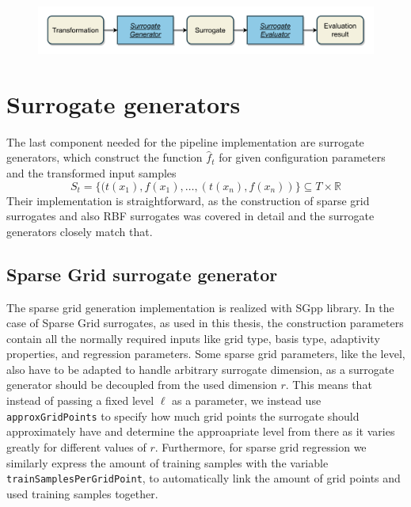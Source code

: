\documentclass[
  a4paper,  %
  twoside,  %
  bibliography=totoc,
  headsepline,
  cleardoublepage=empty,
  parskip=half,
  draft=false
]{scrbook}
\begin{document}
\newpage
\begin{mdframed}[style=style,frametitle={Transformation evaluator (forward looking)}]
\begin{figure}[H]
\includegraphics[width=\textwidth]{graphics/TransformationEval.pdf}
\delimit

\label{fig:te}
\end{figure}
\end{mdframed}

\section {Surrogate generators}
\label{sec:sg}

The last component needed for the pipeline implementation are surrogate generators, which construct the function $\hat{f}_t$ for given configuration parameters and the transformed input samples
\begin{equation}
S_t=\{(t(x_1), f(x_1), \dots, (t(x_n), f(x_n))\} \subseteq T \times \mathds{R}
\end{equation}
Their implementation is straightforward, as the construction of sparse grid surrogates and also RBF surrogates was covered in detail and the surrogate generators closely match that.


\subsection {Sparse Grid surrogate generator}

The sparse grid generation implementation is realized with SGpp \cite{Pflueger2010} library.
In the case of Sparse Grid surrogates, as used in this thesis, the construction parameters contain all the normally required inputs like grid type, basis type, adaptivity properties, and regression parameters.
Some sparse grid parameters, like the level, also have to be adapted to handle arbitrary surrogate dimension, as a surrogate generator should be decoupled from the used dimension $r$. 
This means that instead of passing a fixed level $\ell$ as a parameter, we instead use \texttt{approxGridPoints} to specify how much grid points the surrogate should approximately have and determine the approapriate level from there as it varies greatly for different values of $r$.
Furthermore, for sparse grid regression we similarly express the amount of training samples with the variable \texttt{trainSamplesPerGridPoint}, to automatically link the amount of grid points and used training samples together.
\end{document}
